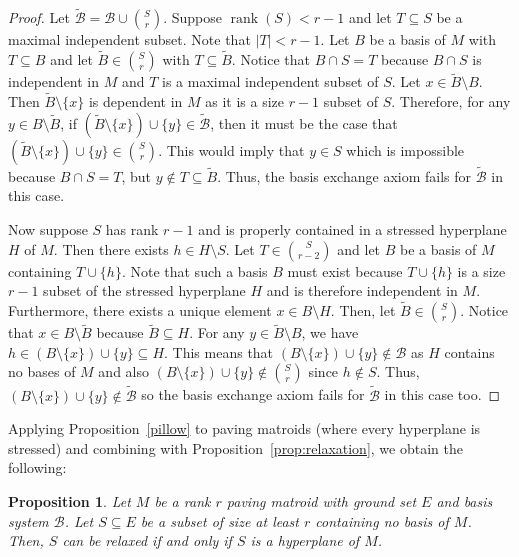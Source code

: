 \documentclass[11pt]{amsart}
\newtheorem{proposition}[theorem]{Proposition}
\theoremstyle{definition}
\newcommand{\0}{\emptyset}
\newcommand{\sm}{\setminus}
\DeclareMathOperator{\rank}{\operatorname{rank}}
\begin{document}
\begin{proof}
Let $\widetilde{\mathcal{B}}=\mathcal{B}\cup\binom{S}{r}$.
Suppose $\rank(S)<r-1$ and let $T\subseteq S$ be a maximal independent subset.
Note that $|T|<r-1$.
Let $B$ be a basis of $M$ with $T\subseteq B$ and let $\widetilde{B} \in \binom{S}{r}$ with $T\subseteq \widetilde{B}$.
Notice that $B \cap S = T$ because $B\cap S$ is independent in $M$ and $T$ is a maximal independent subset of $S$.
Let $x\in \widetilde{B} \sm B$.
Then $\widetilde{B} \sm \{x\}$ is dependent in $M$ as it is a size $r-1$ subset of $S$.
Therefore, for any $y \in B \sm \widetilde{B}$, if $(\widetilde{B}\sm\{x\}) \cup \{y\} \in \widetilde{\mathcal{B}}$, then it must be the case that $(\widetilde{B}\sm\{x\})\cup \{y\} \in \binom{S}{r}$.
This would imply that $y\in S$ which is impossible because $B\cap S = T$, but $y\not\in T\subseteq \widetilde{B}$.
Thus, the basis exchange axiom fails for $\widetilde{\mathcal{B}}$ in this case.

Now suppose $S$ has rank $r-1$ and is properly contained in a stressed hyperplane $H$ of $M$.
Then there exists $h\in H\sm S$.
Let $T \in \binom{S}{r-2}$ and let $B$ be a basis of $M$ containing $T \cup \{h\}$.
Note that such a basis $B$ must exist because $T \cup \{h\}$ is a size $r-1$ subset of the stressed hyperplane $H$ and is therefore independent in $M$.
Furthermore, there exists a unique element $x \in B \sm H$.
Then, let $\widetilde{B} \in \binom{S}{r}$.
Notice that $x \in B \sm \widetilde{B}$ because $\widetilde{B} \subseteq H$.
For any $y \in \widetilde{B} \sm B$, we have $h \in (B \sm \{x\}) \cup \{y\} \subseteq H$.
This means that $(B \sm \{x\}) \cup \{y\} \not\in \mathcal{B}$ as $H$ contains no bases of $M$ and also $(B\sm \{x\}) \cup \{y\} \notin \binom{S}{r}$ since $h \notin S$.
Thus, $(B\sm \{x\}) \cup \{y\} \notin \widetilde{\mathcal{B}}$ so the basis exchange axiom fails for $\widetilde{\mathcal{B}}$ in this case too.
\end{proof}

Applying Proposition~\ref{pillow} to paving matroids (where every hyperplane is stressed) and combining with Proposition~\ref{prop:relaxation}, we obtain the following:

\begin{proposition}\label{prop:general-relaxing-for-paving}
Let $M$ be a rank $r$ paving matroid with ground set $E$ and basis system $\mathcal{B}$.
Let $S \subseteq E$ be a subset of size at least $r$ containing no basis of $M$.
Then, $S$ can be relaxed if and only if $S$ is a hyperplane of $M$.
\end{proposition}
\end{document}
